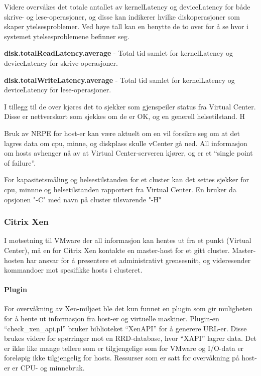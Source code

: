 Videre overvåkes det totale antallet av kernelLatency og deviceLatency for både skrive- og lese-operasjoner, og disse kan indikerer hvilke diskoperasjoner som skaper ytelsesproblemer. Ved høye tall kan en benytte de to over for å se hvor i systemet ytelsesproblemene befinner seg. 

{\bf disk.totalReadLatency.average} - Total tid samlet for kernelLatency og deviceLatency for skrive-operasjoner. 

{\bf disk.totalWriteLatency.average} - Total tid samlet for kernelLatency og deviceLatency for lese-operasjoner.

I tillegg til de over kjøres det to sjekker som gjenspeiler status fra Virtual Center. Disse er nettverskort som sjekkes om de er OK, og en generell helsetilstand. H

Bruk av NRPE for host-er kan være aktuelt om en vil forsikre seg om at det lagres data om cpu, minne, og diskplass skulle vCenter gå ned. All informasjon om hosts avhenger nå av at Virtual Center-serveren kjører, og er et ``single point of failure''.

For kapasitetsmåling og helsestilstanden for et cluster kan det settes sjekker for cpu, minnne og helsetilstanden rapportert fra Virtual Center. En bruker da opsjonen "-C" med navn på cluster tilsvarende "-H"

\subsubsection{Citrix Xen}
I motsetning til VMware der all informasjon kan hentes ut fra et punkt (Virtual Center), må en for Citrix Xen  kontakte en master-host for et gitt cluster. Master-hosten har ansvar for å presentere et administrativt grensesnitt, og videresender kommandoer mot spesifikke hosts i clusteret.

\paragraph{Plugin}
For overvåkning av Xen-miljøet ble det kun funnet en plugin som gir muligheten for å hente ut informasjon fra host-er og virtuelle maskiner. Plugin-en ``check\_xen\_api.pl'' bruker biblioteket ``XenAPI'' for å generere URL-er. Disse brukes videre for spørringer mot en RRD-database, hvor ``XAPI'' lagrer data\cite{xenwiki}. Det er ikke like mange tellere som er tilgjengelige som for VMware og I/O-data er foreløpig ikke tilgjengelig for hosts. Ressurser som er satt for overvåkning på host-er er CPU- og minnebruk.

